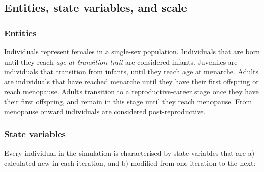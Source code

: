 \documentclass{article}
\begin{document}
\subsection{Entities, state variables, and scale}

\subsubsection{Entities}

Individuals represent females in a single-sex population. Individuals that are born until they reach \emph{age at transition trait} are considered infants. Juveniles are individuals that transition from infants, until they reach age at menarche. Adults are individuals that have reached menarche until they have their first offspring or reach menopause. Adults transition to a reproductive-career stage once they have their first offspring, and remain in this stage until they reach menopause. From menopause onward individuals are considered post-reproductive.

\subsubsection{State variables}

Every individual in the simulation is characterised by state variables that are a) calculated new in each iteration, and b) modified from one iteration to the next:
\end{document}
